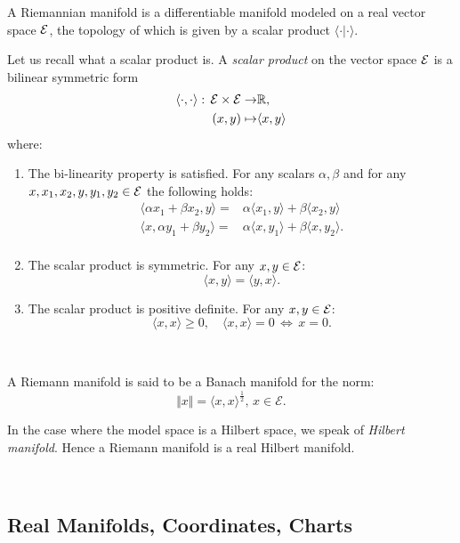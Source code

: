 \begin{definition}
A Riemannian manifold is a differentiable manifold modeled on a real vector space  $\mathcal{E}$, the topology of which is given by a scalar product $\langle\cdot|\cdot\rangle$.
\end{definition}
Let us recall what a scalar product is. A \emph{scalar product} on the vector space $\mathcal{E}$ is a bilinear symmetric form 
\begin{align*}
\langle\cdot,\cdot\rangle:\,  \mathcal{E}\times \mathcal{E} \to &  \mathbb{R},  \\
 (x,y)\mapsto&  \langle x, y \rangle  \\
\end{align*}
 where:
\begin{enumerate}
\item  The bi-linearity property is satisfied. For any scalars $\alpha, \beta$ and for any $x,x_1,x_2,y,y_1,y_2\in \mathcal{E}$ the following holds: 
\begin{align*}
\langle\alpha x_{1} +\beta x_{2}, y\rangle=& \alpha\langle x_{1} ,y \rangle+\beta \langle x_{2},y\rangle\\
\langle x, \alpha y_{1} +\beta y_{2}\rangle=&\alpha\langle x ,y_{1}\rangle +\beta \langle x,y_{2}\rangle.\\
\end{align*}

\item The scalar product is symmetric. For any $x,y \in \mathcal{E}$: \[\langle x,y\rangle=\langle y,x\rangle.\] 
\item The scalar product is positive definite. For any $x,y\in \mathcal{E}$: \[\langle x, x \rangle \geq 0, \quad  \langle x, x\rangle =0 \,   \iff \, x=0.\]
\end{enumerate}

\, 

A Riemann manifold is said to be a Banach manifold for the norm: \[\Vert x\Vert=\langle x,x\rangle^{\frac{1}{2}},\, x\in \mathcal{E}.\]

In the case where the model space is a Hilbert space, we speak of \emph{ Hilbert manifold}. Hence a Riemann manifold is a real Hilbert manifold.

\,
\subsection{Real Manifolds,  Coordinates, Charts}
\ 

